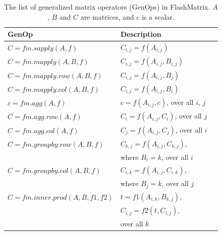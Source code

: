 \begin{table}
\begin{center}
\footnotesize
\begin{tabular}{|l|l|l|}
\hline
GenOp & Description \\
\hline
$C=fm.sapply(A, f)$ & $C_{i,j}=f(A_{i,j})$ \\
\hline
$C=fm.mapply(A, B, f)$ & $C_{i,j}=f(A_{i,j}, B_{i,j})$ \\
\hline
$C=fm.mapply.row(A, B, f)$ & $C_{i,j}=f(A_{i,j}, B_j)$ \\
\hline
$C=fm.mapply.col(A, B, f)$ & $C_{i,j}=f(A_{i,j}, B_i)$ \\
\hline
$c=fm.agg(A, f)$ & $c=f(A_{i,j}, c)$, over all $i$, $j$ \\
\hline
$C=fm.agg.row(A, f)$ & $C_i=f(A_{i,j}, C_i)$, over all $j$ \\
\hline
$C=fm.agg.col(A, f)$ & $C_j=f(A_{i,j}, C_j)$, over all $i$ \\
\hline
$C=fm.groupby.row(A, B, f)$ & $C_{k,j}=f(A_{i,j}, C_{k,j})$,\\ & where $B_i=k$, over all $i$ \\
\hline
$C=fm.groupby.col(A, B, f)$ & $C_{i,k}=f(A_{i,j}, C_{i,k})$,\\ & where $B_j=k$, over all $j$ \\
\hline
$C=fm.inner.prod(A, B, f1, f2)$ & $t=f1(A_{i,k}, B_{k,j})$,
\\ & $C_{i,j}=f2(t, C_{i,j})$,
\\ & over all $k$ \\
\hline
\end{tabular}
\normalsize
\end{center}
\caption{The list of generalized matrix operators (GenOps) in FlashMatrix.
$A$, $B$ and $C$ are matrices, and $c$ is a scalar.}
\label{tbl:genops}
\end{table}

